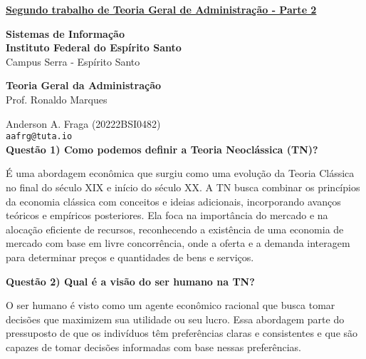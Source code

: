 \documentclass[11pt]{article}
\begin{document}
\underline{\textbf{Segundo trabalho de Teoria Geral de Administração - Parte 2}}\par
\textbf{Sistemas de Informação}\\
\textbf{Instituto Federal do Espírito Santo}\\
Campus Serra - Espírito Santo\par
\textbf{Teoria Geral da Administração}\\
Prof. Ronaldo Marques\par
Anderson A. Fraga (20222BSI0482)\\
\texttt{aafrg@tuta.io}\\  %


\noindent \textbf{Questão 1) Como podemos definir a Teoria Neoclássica (TN)?}\par
É uma abordagem econômica que surgiu como uma evolução da Teoria Clássica no final do século XIX e início do século XX. A TN busca combinar os princípios da economia clássica com conceitos e ideias adicionais, incorporando avanços teóricos e empíricos posteriores. Ela foca na importância do mercado e na alocação eficiente de recursos, reconhecendo a existência de uma economia de mercado com base em livre concorrência, onde a oferta e a demanda interagem para determinar preços e quantidades de bens e serviços.

\noindent \textbf{Questão 2) Qual é a visão do ser humano na TN?}\par
O ser humano é visto como um agente econômico racional que busca tomar decisões que maximizem sua utilidade ou seu lucro. Essa abordagem parte do pressuposto de que os indivíduos têm preferências claras e consistentes e que são capazes de tomar decisões informadas com base nessas preferências.
\end{document}
